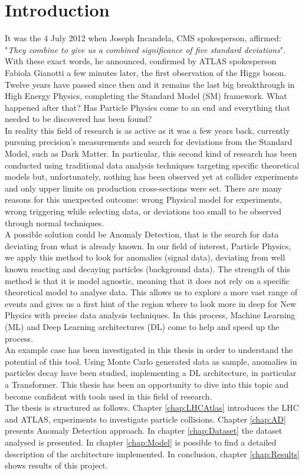 \chapter*{Introduction}
It was the 4 July 2012 when Joseph Incandela, CMS spokesperson, affirmed: "\textit{They combine to give us a combined significance of five standard deviations}". With these exact words, he announced, confirmed by ATLAS spokesperson Fabiola Gianotti a few minutes later, the first observation of the Higgs boson. Twelve years have passed since then and it remains the last big breakthrough in High Energy Physics, completing the Standard Model (SM) framework. What happened after that? Has Particle Physics come to an end and everything that needed to be discovered has been found? \\
In reality this field of research is as active as it was a few years back, currently pursuing precision's measurements and search for deviations from the Standard Model, such as Dark Matter. In particular, this second kind of research has been conducted using traditional data analysis techniques targeting specific theoretical models but, unfortunately, nothing has been observed yet at collider experiments and only upper limits on production cross-sections were set. There are many reasons for this unexpected outcome: wrong Physical model for experiments, wrong triggering while selecting data, or deviations too small to be observed through normal techniques.\\
A possible solution could be Anomaly Detection, that is the search for data deviating from what is already known. In our field of interest, Particle Physics, we apply this method to look for anomalies (signal data), deviating from well known reacting and decaying particles (background data). The strength of this method is that it is model agnostic, meaning that it does not rely on a specific theoretical model to analyse data. This allows us to explore a more vast range of events and gives us a first hint of the region where to look more in deep for New Physics with precise data analysis techniques. In this process, Machine Learning (ML) and Deep Learning architectures (DL) come to help and speed up the process.\\




An example case has been investigated in this thesis in order to understand the potential of this tool. Using Monte Carlo generated data as sample, anomalies in particles decay have been studied, implementing a DL architecture, in particular a Transformer. This thesis has been an opportunity to dive into this topic and become confident with tools used in this field of research.\\
The thesis is structured as follows. Chapter \ref{chap:LHCAtlas} introduces the LHC and ATLAS, experiments to investigate particle collisions. Chapter \ref{chap:AD} presents Anomaly Detection approach. In chapter \ref{chap:Dataset} the dataset analysed is presented. In chapter \ref{chap:Model} is possible to find a detailed description of the architecture implemented. In conclusion, chapter \ref{chap:Results} shows results of this project.\\\\

